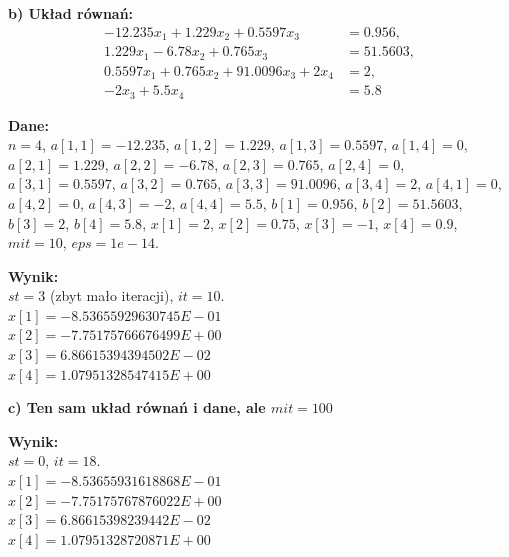 \documentclass[11pt,a4paper]{article}
\begin{document}
\vspace{1.5em}
\noindent \textbf{b) Układ równań:}
\begin{align*}
    -12.235x_{1}+1.229x_{2}+0.5597x_{3} &= 0.956, \\
    1.229x_{1}-6.78x_{2}+0.765x_{3} &= 51.5603, \\
    0.5597x_{1}+0.765x_{2}+91.0096x_{3}+2x_{4} &= 2, \\
    -2x_{3}+5.5x_{4} &= 5.8
\end{align*}

\noindent \textbf{Dane:} \\
$n=4$, $a[1,1]=-12.235$, $a[1,2]=1.229$, $a[1,3]=0.5597$, $a[1,4]=0$, $a[2,1]=1.229$, $a[2,2]=-6.78$, $a[2,3]=0.765$, $a[2,4]=0$, $a[3,1]=0.5597$, $a[3,2]=0.765$, $a[3,3]=91.0096$, $a[3,4]=2$, $a[4,1]=0$, $a[4,2]=0$, $a[4,3]=-2$, $a[4,4]=5.5$, $b[1]=0.956$, $b[2]=51.5603$, $b[3]=2$, $b[4]=5.8$, $x[1]=2$, $x[2]=0.75$, $x[3]=-1$, $x[4]=0.9$, $mit=10$, $eps=1e-14$.

\vspace{0.5em}
\noindent \textbf{Wynik:} \\
$st=3$ (zbyt mało iteracji), $it=10$. \\
$x[1] = -8.53655929630745E-01$ \\
$x[2] = -7.75175766676499E+00$ \\
$x[3] =  6.86615394394502E-02$ \\
$x[4] =  1.07951328547415E+00$

\vspace{1.5em}
\noindent \textbf{c) Ten sam układ równań i dane, ale $mit=100$}

\vspace{0.5em}
\noindent \textbf{Wynik:} \\
$st=0$, $it=18$. \\
$x[1] = -8.53655931618868E-01$ \\
$x[2] = -7.75175767876022E+00$ \\
$x[3] =  6.86615398239442E-02$ \\
$x[4] =  1.07951328720871E+00$
\end{document}
